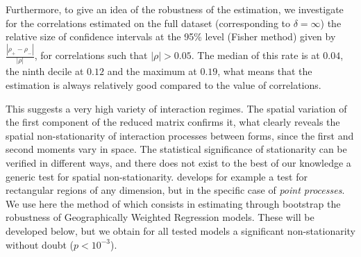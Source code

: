 \documentclass[11pt]{article}
\begin{document}
Furthermore, to give an idea of the robustness of the estimation, we investigate for the correlations estimated on the full dataset (corresponding to $\delta = \infty$) the relative size of confidence intervals at the 95\% level (Fisher method) given by $\frac{\left|\rho_+ - \rho_-\right|}{\left|\rho\right|}$, for correlations such that $\left|\rho\right|>0.05$. The median of this rate is at $0.04$, the ninth decile at $0.12$ and the maximum at $0.19$, what means that the estimation is always relatively good compared to the value of correlations.



This suggests a very high variety of interaction regimes. The spatial variation of the first component of the reduced matrix confirms it, what clearly reveals the spatial non-stationarity of interaction processes between forms, since the first and second moments vary in space. The statistical significance of stationarity can be verified in different ways, and there does not exist to the best of our knowledge a generic test for spatial non-stationarity. \cite{zhang2014test} develops for example a test for rectangular regions of any dimension, but in the specific case of \emph{point processes}. We use here the method of \cite{leung2000statistical} which consists in estimating through bootstrap the robustness of Geographically Weighted Regression models. These will be developed below, but we obtain for all tested models a significant non-stationarity without doubt ($p<10^{-3}$).

\end{document}
